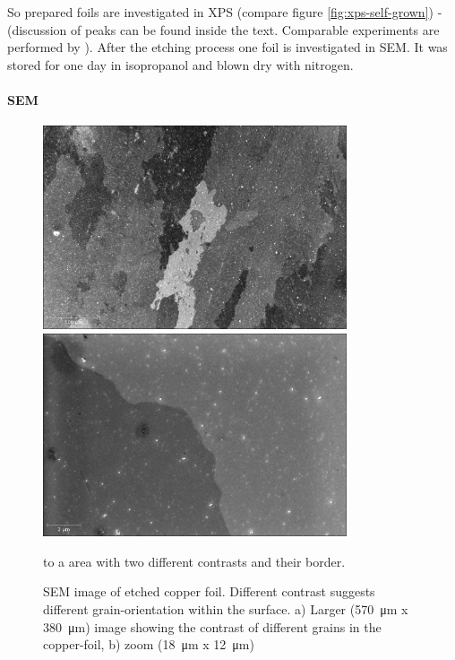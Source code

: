 So prepared foils are investigated in XPS (compare figure \ref{fig:xps-self-grown}) - (discussion of peaks can be found inside the text. Comparable experiments  are performed by \cite[8]{stables_report_2008}).
After the etching process one foil is investigated in SEM. It was stored for one day in isopropanol and blown dry with nitrogen. 

\paragraph{SEM}



\begin{figure}[]
	\begin{center}
		\includegraphics[height=6cm]{./images/Domenik_16031715.jpg}
		\includegraphics[height=6cm]{./images/Domenik_16031717.jpg}
	\end{center}
	\caption{SEM image of etched copper foil. Different contrast suggests different grain-orientation within the surface. a) Larger (\SI{570}{\micro \meter} x \SI{380}{\micro \meter}) image showing the contrast of different grains in the copper-foil, b) zoom (\SI{18}{\micro \meter} x \SI{12}{\micro \meter})} to a area with two different contrasts and their border.
	\label{fig:SEM-gb}
\end{figure}

